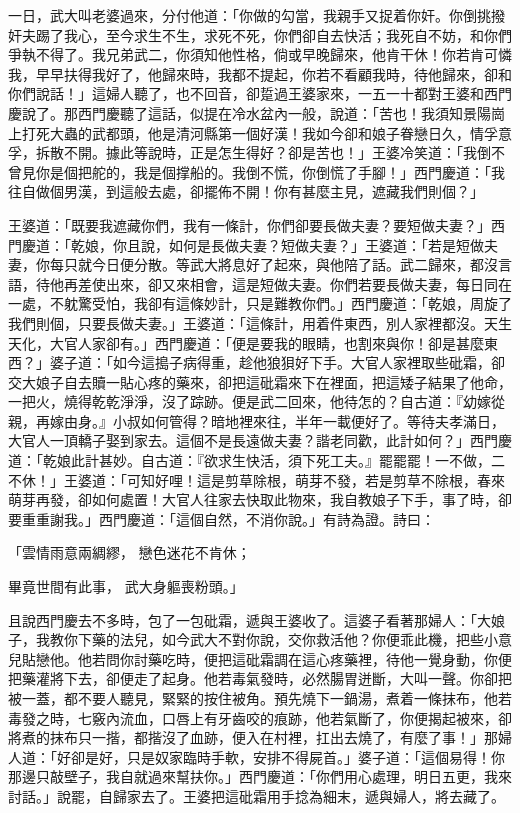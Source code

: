 \begin{showcontents}{}
一日，武大叫老婆過來，分付他道：「你做的勾當，我親手又捉着你奸。你倒挑撥奸夫踢了我心，至今求生不生，求死不死，你們卻自去快活；我死自不妨，和你們爭執不得了。我兄弟武二，你須知他性格，倘或早晚歸來，他肯干休！你若肯可憐我，早早扶得我好了，他歸來時，我都不提起，你若不看顧我時，待他歸來，卻和你們說話！」這婦人聽了，也不回音，卻踅過王婆家來，一五一十都對王婆和西門慶說了。那西門慶聽了這話，似提在冷水盆內一般，說道：「苦也！我須知景陽崗上打死大蟲的武都頭，他是清河縣第一個好漢！我如今卻和娘子眷戀日久，情孚意孚，拆散不開。據此等說時，正是怎生得好？卻是苦也！」王婆冷笑道：「我倒不曾見你是個把舵的，我是個撑船的。我倒不慌，你倒慌了手腳！」西門慶道：「我往自做個男漢，到這般去處，卻擺佈不開！你有甚麼主見，遮藏我們則個？」

王婆道：「既要我遮藏你們，我有一條計，你們卻要長做夫妻？要短做夫妻？」西門慶道：「乾娘，你且說，如何是長做夫妻？短做夫妻？」王婆道：「若是短做夫妻，你每只就今日便分散。等武大將息好了起來，與他陪了話。武二歸來，都沒言語，待他再差使出來，卻又來相會，這是短做夫妻。你們若要長做夫妻，每日同在一處，不躭驚受怕，我卻有這條妙計，只是難教你們。」西門慶道：「乾娘，周旋了我們則個，只要長做夫妻。」王婆道：「這條計，用着件東西，別人家裡都沒。天生天化，大官人家卻有。」西門慶道：「便是要我的眼睛，也割來與你！卻是甚麼東西？」婆子道：「如今這搗子病得重，趁他狼狽好下手。大官人家裡取些砒霜，卻交大娘子自去贖一貼心疼的藥來，卻把這砒霜來下在裡面，把這矮子結果了他命，一把火，燒得乾乾淨淨，沒了踪跡。便是武二回來，他待怎的？自古道：『幼嫁從親，再嫁由身。』小叔如何管得？暗地裡來往，半年一載便好了。等待夫孝滿日，大官人一頂轎子娶到家去。這個不是長遠做夫妻？諧老同歡，此計如何？」西門慶道：「乾娘此計甚妙。自古道：『欲求生快活，須下死工夫。』罷罷罷！一不做，二不休！」王婆道：「可知好哩！這是剪草除根，萌芽不發，若是剪草不除根，春來萌芽再發，卻如何處置！大官人往家去快取此物來，我自教娘子下手，事了時，卻要重重謝我。」西門慶道：「這個自然，不消你說。」有詩為證。詩曰：

「雲情雨意兩綢繆，  戀色迷花不肯休；

畢竟世間有此事，  武大身軀喪粉頭。」

且說西門慶去不多時，包了一包砒霜，遞與王婆收了。這婆子看著那婦人：「大娘子，我教你下藥的法兒，如今武大不對你說，交你救活他？你便乖此機，把些小意兒貼戀他。他若問你討藥吃時，便把這砒霜調在這心疼藥裡，待他一覺身動，你便把藥灌將下去，卻便走了起身。他若毒氣發時，必然腸胃迸斷，大叫一聲。你卻把被一蓋，都不要人聽見，緊緊的按住被角。預先燒下一鍋湯，煮着一條抹布，他若毒發之時，七竅內流血，口唇上有牙齒咬的痕跡，他若氣斷了，你便揭起被來，卻將煮的抹布只一揩，都揩沒了血跡，便入在村裡，扛出去燒了，有麼了事！」那婦人道：「好卻是好，只是奴家臨時手軟，安排不得屍首。」婆子道：「這個易得！你那邊只敲壁子，我自就過來幫扶你。」西門慶道：「你們用心處理，明日五更，我來討話。」說罷，自歸家去了。王婆把這砒霜用手捻為細末，遞與婦人，將去藏了。


\end{showcontents}
